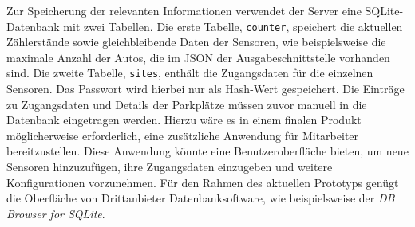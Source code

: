 Zur Speicherung der relevanten Informationen verwendet der Server eine SQLite-Datenbank mit zwei Tabellen.
Die erste Tabelle, \lstinline|counter|, speichert die aktuellen Zählerstände sowie gleichbleibende Daten der Sensoren, wie beispielsweise die maximale Anzahl der Autos, die im JSON der Ausgabeschnittstelle vorhanden sind.
Die zweite Tabelle, \lstinline|sites|, enthält die Zugangsdaten für die einzelnen Sensoren.
Das Passwort wird hierbei nur als Hash-Wert gespeichert.
Die Einträge zu Zugangsdaten und Details der Parkplätze müssen zuvor manuell in die Datenbank eingetragen werden.
Hierzu wäre es in einem finalen Produkt möglicherweise erforderlich, eine zusätzliche Anwendung für Mitarbeiter bereitzustellen.
Diese Anwendung könnte eine Benutzeroberfläche bieten, um neue Sensoren hinzuzufügen, ihre Zugangsdaten einzugeben und weitere Konfigurationen vorzunehmen.
Für den Rahmen des aktuellen Prototyps genügt die Oberfläche von Drittanbieter Datenbanksoftware, wie beispielsweise der \textit{DB Browser for SQLite}.
